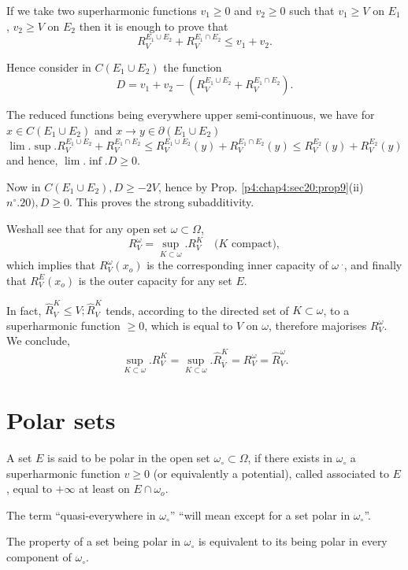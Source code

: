 If we take two superharmonic functions $v_1 \ge 0$ and $v_2 \ge 0$
such that  $v_1 \ge V$ on $E_1$, $v_2 \ge V$ on $E_2$ then it is
enough to prove that 
$$
R_V^{E_1 \cup E_2}+  R^{E_1 \cap E_2}_V \le v_1 + v_2.
$$

Hence consider in $C (E_1 \cup E_2)$ the function 
$$
D = v_1 + v_2 -\left(R_V^{E_1 \cup E_2}+  R^{E_1 \cap E_2}_V\right).
$$ 

The reduced functions being everywhere upper semi-continuous, we have
for $x \in C (E_1 \cup E_2)$ and $x \to y \in \partial (E_1 \cup E_2)$ 
$$
\lim.  \sup.  R_V^{E_1 \cup E_2}+   R^{E_1 \cap E_2}_V  \le  R^{E_1
  \cup E_2}_V(y) + R_V^{E_1 \cap E_2} (y) \le  R^{E_2}_V (y) +
R^{E_2}_V (y) 
$$
and hence, $\lim. \inf. D \ge 0$.

Now in $C (E_1 \cup E_2), D \ge - 2V$, hence by
Prop. \ref{p4:chap4:sec20:prop9}(ii) 
$n^\circ.  20), D \ge 0$. This proves the strong subadditivity. 

We\pageoriginale shall see that for any open set $\omega \subset \Omega$,
$$
R^\omega_V = \sup_{K \subset \omega}. R^K_V \quad (K \text { compact)},
$$
which implies that $R^\omega_V (x_o)$ is the corresponding inner
capacity of $\omega ~ ^.$, and finally that $R^E_V (x_o)$ is the outer
capacity for any set $E$. 

In fact, $\hat{R}^K_V \le V ; \hat{R}^K_V$ tends, according to the
directed set of $K \subset \omega$, to a superharmonic function $\ge
0$, which is equal to $V $ on $\omega$, therefore majorises
$R^\omega_V$. We conclude, 
$$
\sup_{K \subset \omega}. R^K_V = \sup_{K \subset
  \omega}. \hat{R}^K_{\bar{V}} = R^\omega_V = \hat{R}^\omega_V. 
$$

\section{Polar sets}\label{p4:chap7:sec32}%

\begin{defn}\label{p4:chap7:sec32:def21} %
  A set $E$ is said to be polar in the open set $\omega_ \circ \subset
  \Omega$, if there exists in $\omega_\circ$ a superharmonic function
  $v \ge 0$ (or equivalently a potential), called associated to $E$,
  equal to $+ \infty$ at least on $E \cap \omega_o$. 
\end{defn}

  The term ``quasi-everywhere in $\omega_\circ$'' ``will mean except
  for a set polar in $\omega_\circ$''.  

  The property of a set being polar in $\omega_\circ$ is equivalent to
  its being polar in every component of $\omega_\circ$. 
  
